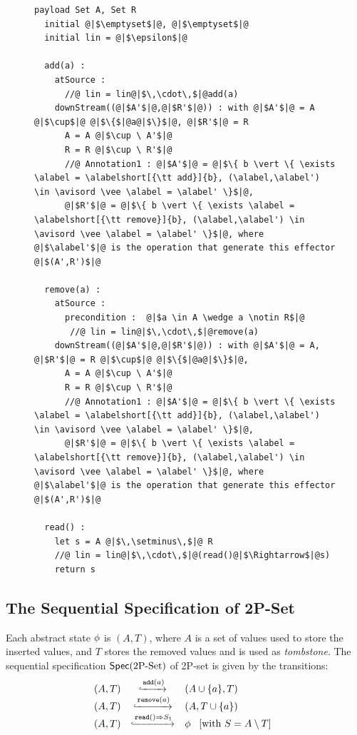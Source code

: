 \begin{figure}[t]
\begin{lstlisting}[frame=top,caption={Pseudo-code of 2P-set},
captionpos=b,label={lst:2P-set}]
  payload Set A, Set R
  initial @|$\emptyset$|@, @|$\emptyset$|@
  initial lin = @|$\epsilon$|@

  add(a) :
    atSource :
      //@ lin = lin@|$\,\cdot\,$|@add(a)
    downStream((@|$A'$|@,@|$R'$|@)) : with @|$A'$|@ = A @|$\cup$|@ @|$\{$|@a@|$\}$|@, @|$R'$|@ = R
      A = A @|$\cup \ A'$|@
      R = R @|$\cup \ R'$|@
      //@ Annotation1 : @|$A'$|@ = @|$\{ b \vert \{ \exists \alabel = \alabelshort[{\tt add}]{b}, (\alabel,\alabel') \in \avisord \vee \alabel = \alabel' \}$|@,
      @|$R'$|@ = @|$\{ b \vert \{ \exists \alabel = \alabelshort[{\tt remove}]{b}, (\alabel,\alabel') \in \avisord \vee \alabel = \alabel' \}$|@, where @|$\alabel'$|@ is the operation that generate this effector @|$(A',R')$|@

  remove(a) :
    atSource :
      precondition :  @|$a \in A \wedge a \notin R$|@
       //@ lin = lin@|$\,\cdot\,$|@remove(a)
    downStream((@|$A'$|@,@|$R'$|@)) : with @|$A'$|@ = A, @|$R'$|@ = R @|$\cup$|@ @|$\{$|@a@|$\}$|@,
      A = A @|$\cup \ A'$|@
      R = R @|$\cup \ R'$|@
      //@ Annotation1 : @|$A'$|@ = @|$\{ b \vert \{ \exists \alabel = \alabelshort[{\tt add}]{b}, (\alabel,\alabel') \in \avisord \vee \alabel = \alabel' \}$|@,
      @|$R'$|@ = @|$\{ b \vert \{ \exists \alabel = \alabelshort[{\tt remove}]{b}, (\alabel,\alabel') \in \avisord \vee \alabel = \alabel' \}$|@, where @|$\alabel'$|@ is the operation that generate this effector @|$(A',R')$|@

  read() :
    let s = A @|$\,\setminus\,$|@ R
    //@ lin = lin@|$\,\cdot\,$|@(read()@|$\Rightarrow$|@s)
    return s
\end{lstlisting}
\end{figure}



\subsection{The Sequential Specification of 2P-Set}
\label{subsec:the sequential specification of 2P-set}

Each abstract state $\abstate$ is $(A,T)$, where $A$ is a set of values used to store the inserted values, and $T$ stores the removed values and is used as \emph{tombstone}. The sequential specification $\specTwoPSet$ of 2P-set is given by the transitions:
\[
  \begin{array}{rcl}
    (A,T) &
               \specarrow{\alabelshort[\mathtt{add}]{a}}
    & (A \cup \{ a \},T) \\
    (A,T) &
               \specarrow{\alabelshort[\mathtt{remove}]{a}}
    & (A,T \cup \{a\}) \\
    (A,T)
    & \specarrow{\alabellong[\mathtt{read}]{}{ S_1 }{}}
    & \abstate\
      \begin{array}{c}
        [\text{with}\ S = A \setminus T]
      \end{array}
  \end{array}
\]

